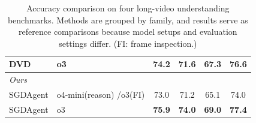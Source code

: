 \documentclass[11pt]{article}
\begin{document}
\begin{table}[!tb]
\begin{tabularx}{\textwidth}{@{}lXcccc@{}}
    DVD~\cite{deepvideo2025}
      & o3            & 74.2 & 71.6 & 67.3 & 76.6 \\
    \midrule
    \multicolumn{6}{l}{\textit{Ours}} \\
    SGDAgent
      & o4-mini(reason) /o3(FI)      & 73.0 & 71.2 & 65.1 & 74.0 \\
    SGDAgent
      & o3            & \textbf{75.9} & \textbf{74.0} & \textbf{69.0} & \textbf{77.4} \\
    \bottomrule
  \end{tabularx}
  \caption{Accuracy comparison on four long-video understanding benchmarks.
  Methods are grouped by family, and results serve as reference comparisons because model setups and evaluation settings differ. (FI: frame inspection.)}
  \label{tab:main_comparison}

\end{table}


\end{document}
